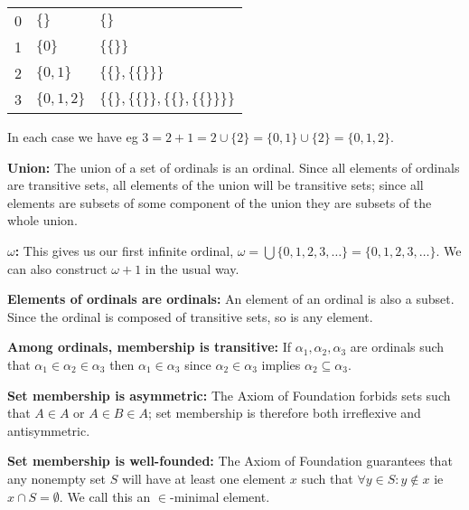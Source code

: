 \documentclass{article}
\begin{document}
\begin{tabular}{ l l l }
0 & $\{\}$ & $\{\}$ \\
1 & $\{0\}$ & $\{\{\}\}$ \\
2 & $\{0, 1\}$ & $\{\{\}, \{\{\}\}\}$ \\
3 & $\{0, 1, 2\}$ & $\{\{\}, \{\{\}\}, \{\{\}, \{\{\}\}\}\}$ \\
\end{tabular}

In each case we have eg $3 = 2 + 1 = 2 \cup \{2\} = \{0, 1\} \cup \{2\} = \{0, 1, 2\}$.

\textbf{Union:} The union of a set of ordinals is an ordinal. Since all elements of ordinals are transitive sets, all elements of the union will be transitive sets; since all elements are subsets of some component of the union they are subsets of the whole union.

\textbf{$\omega$:} This gives us our first infinite ordinal, $\omega = \bigcup\{0, 1, 2, 3, \ldots\} =  \{0, 1, 2, 3, \ldots\}$. We can also construct $\omega + 1$ in the usual way.

\textbf{Elements of ordinals are ordinals:} An element of an ordinal is also a subset. Since the ordinal is composed of transitive sets, so is any element.

\textbf{Among ordinals, membership is transitive:} If $\alpha_1, \alpha_2, \alpha_3$ are ordinals such that $\alpha_1 \in \alpha_2 \in \alpha_3$ then $\alpha_1 \in \alpha_3$ since $\alpha_2 \in \alpha_3$ implies $\alpha_2 \subseteq \alpha_3$.

\textbf{Set membership is asymmetric:} The Axiom of Foundation forbids sets such that $A \in A$ or $A \in B \in A$; set membership is therefore both irreflexive and antisymmetric.

\textbf{Set membership is well-founded:} The Axiom of Foundation guarantees that any nonempty set $S$ will have at least one element $x$ such that $\forall y \in S: y \not\in x$ ie $x \cap S = \emptyset$. We call this an $\in$-minimal element.
\end{document}
